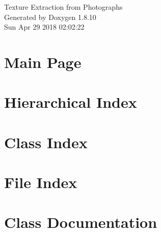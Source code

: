 \documentclass[twoside]{book}
\newcommand{\+}{\discretionary{\mbox{\scriptsize$\hookleftarrow$}}{}{}}
\newcommand{\clearemptydoublepage}{%
  \newpage{\pagestyle{empty}\cleardoublepage}%
}
\begin{document}
\hypersetup{pageanchor=false,
             bookmarks=true,
             bookmarksnumbered=true,
             pdfencoding=unicode
            }
\begin{titlepage}
\vspace*{7cm}
\begin{center}%
{\Large Texture Extraction from Photographs }\\
\vspace*{1cm}
{\large Generated by Doxygen 1.8.10}\\
\vspace*{0.5cm}
{\small Sun Apr 29 2018 02:02:22}\\
\end{center}
\end{titlepage}
\clearemptydoublepage
\tableofcontents
\clearemptydoublepage
{}
\hypersetup{pageanchor=true}

\chapter{Main Page}
\label{index}\hypertarget{index}{}
\chapter{Hierarchical Index}

\chapter{Class Index}

\chapter{File Index}

\chapter{Class Documentation}





























\end{document}
